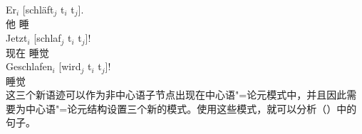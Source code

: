 \eal\settowidth{}
\ex 
\gll Er$_i$    [schläft$_j$ t$_i$ t$_j$].\\
	 他 \spacebr{}睡\\  
\ex 
\gll Jetzt$_i$ [schlaf$_j$ t$_i$ t$_j$]!\\
	 现在 \spacebr{}睡觉\\   
\ex 
\gll Geschlafen$_i$ [wird$_j$ t$_i$ t$_j$]! \\
	 睡觉 \spacebr{}\passiveprs{}\\
\zl
这三个新语迹可以作为非中心语子节点出现在中心语"=论元模式中，并且因此需要为中心语"=论元结构设置三个新的模式。使用这些模式，就可以分析（）中的句子。

